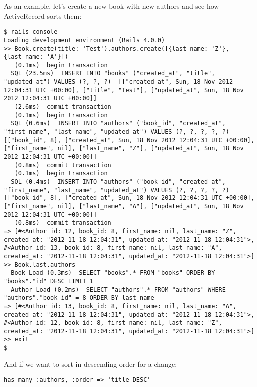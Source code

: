 \documentclass[a4paper]{book}
\begin{document}
As an example, let's create a new book with new authors and see how ActiveRecord sorts them:

\begin{shaded}\begin{verbatim}
$ rails console
Loading development environment (Rails 4.0.0)
>> Book.create(title: 'Test').authors.create([{last_name: 'Z'}, {last_name: 'A'}])
   (0.1ms)  begin transaction
  SQL (23.5ms)  INSERT INTO "books" ("created_at", "title", "updated_at") VALUES (?, ?, ?)  [["created_at", Sun, 18 Nov 2012 12:04:31 UTC +00:00], ["title", "Test"], ["updated_at", Sun, 18 Nov 2012 12:04:31 UTC +00:00]]
   (2.6ms)  commit transaction
   (0.1ms)  begin transaction
  SQL (0.6ms)  INSERT INTO "authors" ("book_id", "created_at", "first_name", "last_name", "updated_at") VALUES (?, ?, ?, ?, ?)  [["book_id", 8], ["created_at", Sun, 18 Nov 2012 12:04:31 UTC +00:00], ["first_name", nil], ["last_name", "Z"], ["updated_at", Sun, 18 Nov 2012 12:04:31 UTC +00:00]]
   (0.8ms)  commit transaction
   (0.1ms)  begin transaction
  SQL (0.4ms)  INSERT INTO "authors" ("book_id", "created_at", "first_name", "last_name", "updated_at") VALUES (?, ?, ?, ?, ?)  [["book_id", 8], ["created_at", Sun, 18 Nov 2012 12:04:31 UTC +00:00], ["first_name", nil], ["last_name", "A"], ["updated_at", Sun, 18 Nov 2012 12:04:31 UTC +00:00]]
   (0.8ms)  commit transaction
=> [#<Author id: 12, book_id: 8, first_name: nil, last_name: "Z", created_at: "2012-11-18 12:04:31", updated_at: "2012-11-18 12:04:31">, #<Author id: 13, book_id: 8, first_name: nil, last_name: "A", created_at: "2012-11-18 12:04:31", updated_at: "2012-11-18 12:04:31">]
>> Book.last.authors
  Book Load (0.3ms)  SELECT "books".* FROM "books" ORDER BY "books"."id" DESC LIMIT 1
  Author Load (0.2ms)  SELECT "authors".* FROM "authors" WHERE "authors"."book_id" = 8 ORDER BY last_name
=> [#<Author id: 13, book_id: 8, first_name: nil, last_name: "A", created_at: "2012-11-18 12:04:31", updated_at: "2012-11-18 12:04:31">, #<Author id: 12, book_id: 8, first_name: nil, last_name: "Z", created_at: "2012-11-18 12:04:31", updated_at: "2012-11-18 12:04:31">]
>> exit
$
\end{verbatim}\end{shaded}

And if we want to sort in descending order for a change:

\begin{shaded}\begin{verbatim}
has_many :authors, :order => 'title DESC'
\end{verbatim}\end{shaded}
\end{document}
